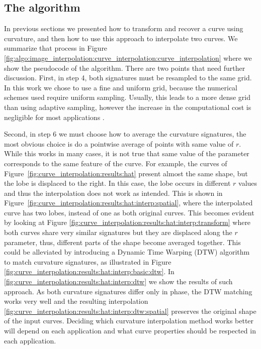 \documentclass{ipol}
\begin{document}
\subsection{The algorithm}
In previous sections we presented how to transform and recover a curve using curvature, and then how to use this approach to interpolate two curves. We summarize that process in Figure \ref{fig:algo:image_interpolation:curve_interpolation:curve_interpolation} where we show the pseudocode of the algorithm. 
There are two points that need further discussion. First, in step 4, both signatures must be resampled to the same grid. In this work we chose to use a fine and uniform grid, because the numerical schemes used require uniform sampling. Usually, this leads to a more dense grid than using adaptive sampling, however the increase in the computational cost is negligible for most applications \cite{math:computer_graphics:pagani:2017:curvature_based_sampling_of_curves}.

Second, in step 6 we must choose how to average the curvature signatures, the most obvious choice is do a pointwise average of points with same value of $r$. While this works in many cases, it is not true that same value of the parameter corresponds to the same feature of the curve. For example, the curves of Figure~\ref{fig:curve_interpolation:results:hat} present almost the same shape, but the lobe is displaced to the right. In this case, the lobe occurs in different $r$ values and thus the interpolation does not work as intended. This is shown in Figure~\ref{fig:curve_interpolation:results:hat:interp:spatial}, where the interpolated curve has two lobes, instead of one as both original curves. This becomes evident by looking at Figure \ref{fig:curve_interpolation:results:hat:interp:transform} where both curves share very similar signatures but they are displaced along the $r$ parameter, thus, different parts of the shape become averaged together. This could be alleviated by introducing a Dynamic Time Warping (DTW)  algorithm \cite{math:numerical:Bellman:1959:on_adaptive_control_processes} to match curvature signatures, as illustrated in Figure \ref{fig:curve_interpolation:results:hat:interp:basic:dtw}.
In \ref{fig:curve_interpolation:results:hat:interp:dtw} we show the results of such approach. As both curvature signatures differ only in phase, the DTW matching works very well and the resulting interpolation \ref{fig:curve_interpolation:results:hat:interp:dtw:spatial} preserves the original shape of the input curves.
Deciding which curvature interpolation method works better will depend on each application and what curve properties should be respected in each application.
\end{document}
